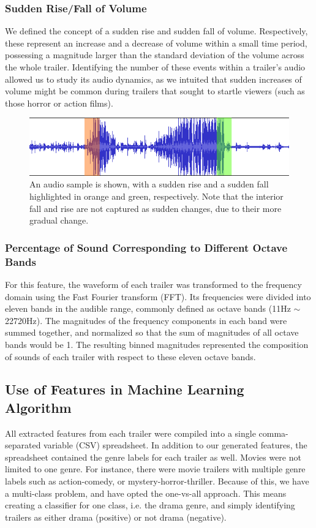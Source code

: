 \documentclass[letterpaper, 10 pt, conference]{ieeeconf}  %
\begin{document}
\subsubsection{Sudden Rise/Fall of Volume}
We defined the concept of a sudden rise and sudden fall of volume. Respectively, these represent an increase and a decrease of volume within a small time period, possessing a magnitude larger than the standard deviation of the volume across the whole trailer. Identifying the number of these events within a trailer's audio allowed us to study its audio dynamics, as we intuited that sudden increases of volume might be common during trailers that sought to startle viewers (such as those horror or action films).

\begin{figure}[h]
	\centering
	\includegraphics[width=\columnwidth]{audio_peaks.png}
	\caption{An audio sample is shown, with a sudden rise and a sudden fall highlighted in orange and green, respectively. Note that the interior fall and rise are not captured as sudden changes, due to their more gradual change.}
	\label{f:audio_peaks}
\end{figure}

\subsubsection{Percentage of Sound Corresponding to Different Octave Bands}
For this feature, the waveform of each trailer was transformed to the frequency domain using the Fast Fourier transform (FFT). Its frequencies were divided into eleven bands in the audible range, commonly defined as octave bands (11Hz $\sim$ 22720Hz). The magnitudes of the frequency components in each band were summed together, and normalized so that the sum of magnitudes of all octave bands would be 1. The resulting binned magnitudes represented the composition of sounds of each trailer with respect to these eleven octave bands. 

\subsection{Use of Features in Machine Learning Algorithm}
All extracted features from each trailer were compiled into a single comma-separated variable (CSV) spreadsheet. In addition to our generated features, the spreadsheet contained the genre labels for each trailer as well. Movies were not limited to one genre. For instance, there were movie trailers with multiple genre labels such as action-comedy, or mystery-horror-thriller. Because of this, we have a multi-class problem, and have opted the one-vs-all approach.  This means creating a classifier for one class, i.e. the drama genre, and simply identifying trailers as either drama (positive) or not drama (negative). 
\end{document}
